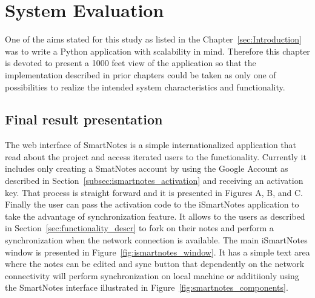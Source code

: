 \chapter{System Evaluation}\label{chap:eval}
One of the aims stated for this study as listed in the Chapter~\ref{sec:Introduction} was to write a Python application with scalability in mind. Therefore this chapter is devoted to present a 1000 feet view of the application so that the implementation described in prior chapters could be taken as only one of possibilities to realize the intended system characteristics and functionality.   

\section{Final result presentation}\label{sec:result} 
The web interface of SmartNotes is a simple internationalized application that read about the project and access iterated users to the functionality. Currently it includes only creating a SmatNotes account by using the Google Account as described in Section~\ref{subsec:ismartnotes_activation} and receiving an activation key. That process is straight forward and it is presented in Figures A, B, and C. Finally the user can pass the activation code to  the iSmartNotes
application to take the advantage of synchronization feature. It allows to the users as described in Section~\ref{sec:functionality_descr} to fork on their notes and perform a synchronization when the network connection is available.
The main iSmartNotes window is presented in Figure~\ref{fig:ismartnotes_window}. It has a simple text area where the notes can be edited and sync button that dependently on the network connectivity will perform synchronization on local machine or additiionly using the SmartNotes interface illustrated in Figure~\ref{fig:smartnotes_components}. 
